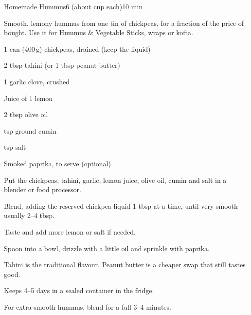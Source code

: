 \begin{recipebox}{Homemade Hummus}{6 (about  cup each)}{10 min}

Smooth, lemony hummus from one tin of chickpeas, for a fraction of the price
of bought. Use it for Hummus \& Vegetable Sticks, wraps or kofta.

\begin{ingredients}
  \item 1 can (400\,g) chickpeas, drained (keep the liquid)
  \item 2 tbsp tahini (or 1 tbsp peanut butter)
  \item 1 garlic clove, crushed
  \item Juice of 1 lemon
  \item 2 tbsp olive oil
  \item {} tsp ground cumin
  \item {} tsp salt
  \item Smoked paprika, to serve (optional)
\end{ingredients}

\begin{method}
  \item Put the chickpeas, tahini, garlic, lemon juice, olive oil, cumin and salt in a blender or food processor.
  \item Blend, adding the reserved chickpea liquid 1 tbsp at a time, until very smooth --- usually 2--4 tbsp.
  \item Taste and add more lemon or salt if needed.
  \item Spoon into a bowl, drizzle with a little oil and sprinkle with paprika.
\end{method}

\begin{notelist}
  \item Tahini is the traditional flavour. Peanut butter is a cheaper swap that still tastes good.
  \item Keeps 4--5 days in a sealed container in the fridge.
  \item For extra-smooth hummus, blend for a full 3--4 minutes.
\end{notelist}

\end{recipebox}
